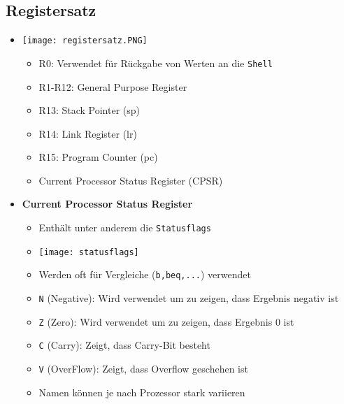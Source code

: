 \subsection{Registersatz}
    \begin{itemize}
        \item[]
            \begin{minipage}{0.2\textwidth}
            \texttt{[image: registersatz.PNG]}
            \end{minipage}
            \begin{minipage}[t]{0.7\textwidth}
            \vspace{-3cm}
                \begin{itemize}
                    \item R0: Verwendet für Rückgabe von Werten an die \texttt{Shell}
                    \item R1-R12: General Purpose Register
                    \item R13: Stack Pointer (sp)
                    \item R14: Link Register (lr)
                    \item R15: Program Counter (pc)
                    \item Current Processor Status Register (CPSR)
                \end{itemize}
            \end{minipage}
        \item \textbf{Current Processor Status Register}
            \begin{itemize}
                \item Enthält unter anderem die \texttt{Statusflags}
                \item[] \texttt{[image: statusflags]}
                \item Werden oft für Vergleiche (\texttt{b,beq,...}) verwendet 
                \item \texttt{N} (Negative): Wird verwendet um zu zeigen, dass Ergebnis negativ ist
                \item \texttt{Z} (Zero): Wird verwendet um zu zeigen, dass Ergebnis 0 ist 
                \item \texttt{C} (Carry): Zeigt, dass Carry-Bit besteht 
                \item \texttt{V} (OverFlow): Zeigt, dass Overflow geschehen ist 
                \item Namen können je nach Prozessor stark variieren
            \end{itemize}
    \end{itemize}



